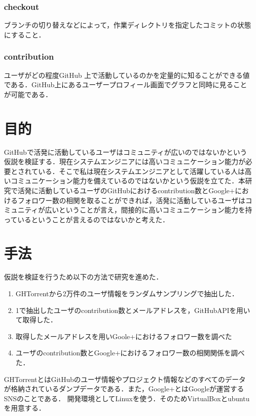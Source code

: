 \subsection{checkout}

ブランチの切り替えなどによって，作業ディレクトリを指定したコミットの状態にすること．

\subsection{contribution}

ユーザがどの程度GitHub 上で活動しているのかを定量的に知ることができる値である．GitHub上にあるユーザープロフィール画面でグラフと同時に見ることが可能である．\cite{yougo}


\chapter{目的}
GitHubで活発に活動しているユーザはコミュニティが広いのではないかという仮説を検証する．現在システムエンジニアには高いコミュニケーション能力が必要とされている．そこで私は現在システムエンジニアとして活躍している人は高いコミュニケーション能力を備えているのではないかという仮説を立てた．本研究で活発に活動しているユーザのGitHubにおけるcontribution数とGoogle+におけるフォロワー数の相関を取ることができれば，活発に活動しているユーザはコミュニティが広いということが言え，間接的に高いコミュニケーション能力を持っているということが言えるのではないかと考えた．


\chapter{手法}
仮説を検証を行うため以下の方法で研究を進めた．

\begin{enumerate}
 \item GHTorrentから2万件のユーザ情報をランダムサンプリングで抽出した．
 \item 1で抽出したユーザのcontribution数とメールアドレスを，GitHubAPIを用いて取得した．
 \item 取得したメールアドレスを用いGoole+におけるフォロワー数を調べた
 \item ユーザのcontribution数とGoogle+におけるフォロワー数の相関関係を調べた．
\end{enumerate}
GHTorrentとはGitHubのユーザ情報やプロジェクト情報などのすべてのデータが格納されているダンプデータである．また，Google+とはGoogleが運営するSNSのことである．
開発環境としてLinuxを使う．そのためVirtualBoxとubuntuを用意する．

